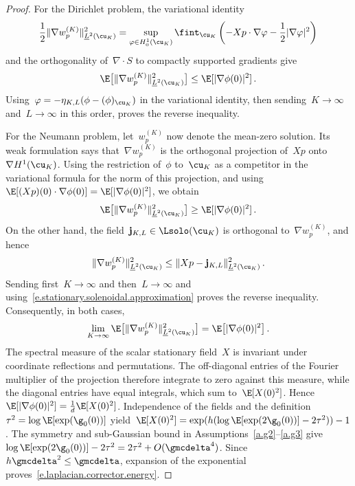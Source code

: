 \documentclass[11pt]{amsart}
\begin{document}
\begin{proof}
\smallskip

For the Dirichlet problem, the variational identity
\begin{equation*}
	\frac12\|\nabla w_p^{(K)}\|_{\underline L^2(\cu_K)}^2
	=
	\sup_{\varphi\in H_0^1(\cu_K)}
	\fint_{\cu_K}
	\left(-Xp\cdot\nabla\varphi-\frac12|\nabla\varphi|^2\right)
\end{equation*}
and the orthogonality of~$\nabla\cdot S$ to compactly supported gradients give
\begin{equation*}
	\E\bigl[\|\nabla w_p^{(K)}\|_{
	\underline L^2(\cu_K)}^2\bigr]
	\leq \E[|\nabla\phi(0)|^2]\,.
\end{equation*}
Using~$\varphi=-\eta_{K,L}(\phi-(\phi)_{\cu_K})$ in the variational identity, then sending~$K\to\infty$ and~$L\to\infty$ in this order, proves the reverse inequality.

\smallskip

For the Neumann problem, let~$w_p^{(K)}$ now denote the mean-zero solution. Its weak formulation says that~$\nabla w_p^{(K)}$ is the orthogonal projection of~$Xp$ onto~$\nabla H^1(\cu_K)$.  Using the restriction of~$\phi$ to~$\cu_K$ as a competitor in the variational formula for the norm of this projection, and using~$\E[(Xp)(0)\cdot\nabla\phi(0)]=\E[|\nabla\phi(0)|^2]$, we obtain
\begin{equation*}
	\E\bigl[\|\nabla w_p^{(K)}\|_{
	\underline L^2(\cu_K)}^2\bigr]
	\geq \E[|\nabla\phi(0)|^2]\,.
\end{equation*}
On the other hand, the field~$\mathbf j_{K,L}\in\Lsolo(\cu_K)$ is orthogonal to~$\nabla w_p^{(K)}$, and hence
\begin{equation*}
	\|\nabla w_p^{(K)}\|_{\underline L^2(\cu_K)}^2
	\leq
	\|Xp-\mathbf j_{K,L}\|_{\underline L^2(\cu_K)}^2\,.
\end{equation*}
Sending first~$K\to\infty$ and then~$L\to\infty$ and using~\eqref{e.stationary.solenoidal.approximation} proves the reverse inequality.  Consequently, in both cases,
\begin{equation*}
	\lim_{K\to\infty}
	\E\bigl[\|\nabla w_p^{(K)}\|_{\underline L^2(\cu_K)}^2\bigr]
	=
	\E\bigl[|\nabla\phi(0)|^2\bigr]\,.
\end{equation*}
The spectral measure of the scalar stationary field~$X$ is invariant under coordinate reflections and permutations.  The off-diagonal entries of the Fourier multiplier of the projection therefore integrate to zero against this measure, while the diagonal entries have equal integrals, which sum to~$\E[X(0)^2]$.  Hence~$\E[|\nabla\phi(0)|^2]=\frac1d\E[X(0)^2]$. Independence of the fields and the definition~$\tau^2=\log\E[\exp(\g_0(0))]$ yield~$\E[X(0)^2]=\exp(h(\log\E[\exp(2\g_0(0))]-2\tau^2))-1$. The symmetry and sub-Gaussian bound in Assumptions~\ref{a.g2}--\ref{a.g3} give~$\log\E[\exp(2\g_0(0))]-2\tau^2=2\tau^2+O(\gmcdelta^4)$. Since~$h\gmcdelta^2\leq\gmcdelta$, expansion of the exponential proves~\eqref{e.laplacian.corrector.energy}.
\end{proof}
\end{document}
